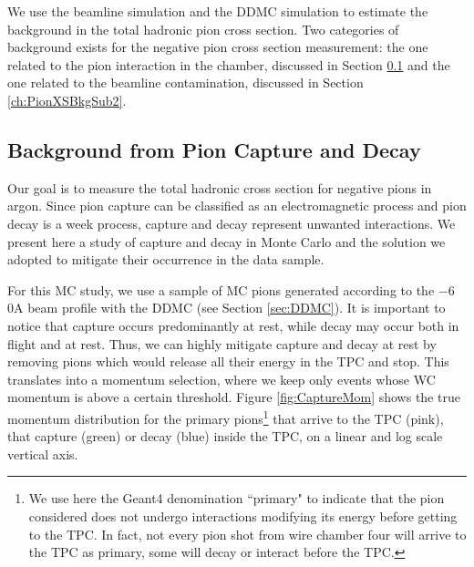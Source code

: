 We use the beamline simulation and the DDMC simulation to estimate the background in the total hadronic pion cross section. Two categories of background exists for the negative pion cross section measurement: the one related to the pion interaction in the chamber, discussed in Section \ref{ch:CaptureAndDecay} and the one related to the beamline contamination, discussed in Section \ref{ch:PionXSBkgSub2}.

\subsection{Background from Pion Capture and Decay}\label{ch:CaptureAndDecay}
Our goal is to measure the total hadronic cross section for negative pions in argon. Since pion capture can be classified as an electromagnetic process and pion decay is a week process,  capture and decay represent unwanted interactions. We present here a study of capture and decay in Monte Carlo and the solution we adopted to mitigate their occurrence in the data sample. 

For this MC study, we use a sample of  MC pions generated according to the  $-6$0A beam profile with the DDMC (see Section \ref{sec:DDMC}). It is important to notice that capture occurs predominantly at rest, while decay may occur both in flight and at rest. Thus, we can highly mitigate capture and decay at rest by removing pions which would release all their energy in the TPC and stop. This translates into a momentum selection, where we keep only events whose WC momentum is above a certain threshold. 
Figure \ref{fig:CaptureMom} shows the true momentum distribution for the primary pions\footnote{We use here the Geant4 denomination ``primary" to indicate that the pion considered does not undergo interactions modifying its energy before getting to the TPC. In fact, not every pion shot from wire chamber four will arrive to the TPC as primary,  some will decay or interact before the TPC.}  that arrive to the TPC (pink), that capture (green) or decay (blue) inside the TPC, on a linear and log scale vertical axis. 




